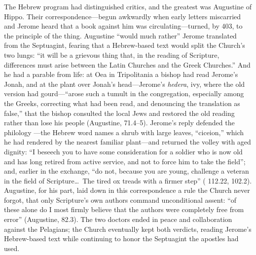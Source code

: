 The Hebrew program had distinguished critics, and the greatest was Augustine
of Hippo. Their correspondence---begun awkwardly when early letters
miscarried and Jerome heard that a book against him was circulating---turned,
by 403, to the principle of the thing. Augustine ``would much rather'' Jerome
translated from the Septuagint, fearing that a Hebrew-based text would split
the Church's two lungs: ``it will be a grievous thing that, in the reading of
Scripture, differences must arise between the Latin Churches and the Greek
Churches.'' And he had a parable from life: at Oea in Tripolitania a bishop
had read Jerome's Jonah, and at the plant over Jonah's head---Jerome's
\textit{hedera}, ivy, where the old version had gourd---``arose such a tumult
in the congregation, especially among the Greeks, correcting what had been
read, and denouncing the translation as false,'' that the bishop consulted
the local Jews and restored the old reading rather than lose his people
(Augustine,  71.4--5). Jerome's reply defended the philology
---the Hebrew word names a shrub with large leaves, ``ciceion,'' which he had
rendered by the nearest familiar plant---and returned the volley with aged
dignity: ``I beseech you to have some consideration for a soldier who is now
old and has long retired from active service, and not to force him to take
the field''; and, earlier in the exchange, ``do not, because you are young,
challenge a veteran in the field of Scripture\ldots\ The tired ox treads with
a firmer step'' ( 112.22, 102.2). Augustine, for his part, laid
down in this correspondence a rule the Church never forgot, that only
Scripture's own authors command unconditional assent: ``of these alone do I
most firmly believe that the authors were completely free from error''
(Augustine,  82.3). The two doctors ended in peace and
collaboration against the Pelagians; the Church eventually kept both
verdicts, reading Jerome's Hebrew-based text while continuing to honor the
Septuagint the apostles had used.
